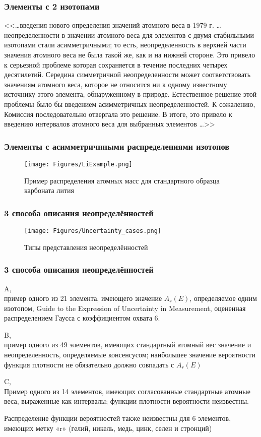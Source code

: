 \begin{frame}
	\frametitle{Элементы с 2 изотопами }
<<\ldots введения нового определения значений атомного веса в 1979 г.
\ldots неопределенности в значении атомного веса для элементов с двумя стабильными изотопами стали асимметричными; то есть, неопределенность в верхней части значения атомного веса не была
такой же, как и на нижней стороне. Это привело к серьезной проблеме
которая сохраняется в течение последних четырех десятилетий. Середина симметричной неопределенности может соответствовать значениям атомного веса, которое не относится ни к одному известному источнику этого элемента, обнаруженному в природе. Естественное решение этой проблемы
было бы введением асимметричных неопределенностей. К сожалению,
Комиссия последовательно отвергала это решение. В итоге,
это привело к введению интервалов атомного веса для
выбранных элементов \ldots >>
\end{frame}

\begin{frame}
		\frametitle{Элементы с асимметричнными распределениями изотопов }
\begin{figure}[ht] 
	\centering\small
	\unitlength=1mm
	\texttt{[image: Figures/LiExample.png]}
	\caption{Пример распределения атомных масс для стандартного образца карбоната лития} 
	\label{f:LiExample}
\end{figure}
\end{frame}

\begin{frame}
	\frametitle{3 способа описания неопределённостей   }
	\begin{figure}[ht] 
		\centering\small
		\unitlength=1mm
		\texttt{[image: Figures/Uncertainty\_cases.png]}
		\caption{Типы представления неопределённостей} 
		\label{f:Uncertainty cases}
	\end{figure}
\end{frame}

\begin{frame}
	\frametitle{3 способа описания неопределённостей   }
A,\\ пример одного из 21 элемента, имеющего значение $A_r (E)$, определяемое одним
изотопом, Guide to the Expression of Uncertainty in
Measurement, оцененная распределением Гаусса с коэффициентом охвата 6.

B, \\пример одного из 49 элементов, имеющих стандартный атомный вес
значение и неопределенность, определяемые
консенсусом; наибольшее значение вероятности
функция плотности не обязательно должно совпадать с $A_r (E)$

C,\\
Пример одного из 14 элементов, имеющих
согласованные стандартные атомные веса, выраженные как
интервалы; функции плотности вероятности неизвестны. 

Распределение функции вероятностей
также неизвестны для 6 элементов, имеющих
метку «r» (гелий, никель, медь, цинк, селен и стронций)


\end{frame}

